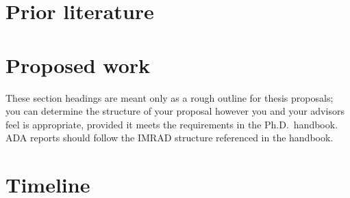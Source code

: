 \documentclass[draft]{cmustatproposal} %
\begin{document}
\section{Prior literature}

\section{Proposed work}

These section headings are meant only as a rough outline for thesis proposals;
you can determine the structure of your proposal however you and your advisors
feel is appropriate, provided it meets the requirements in the Ph.D.\ handbook.
ADA reports should follow the IMRAD structure referenced in the handbook.

\section{Timeline}


\end{document}
